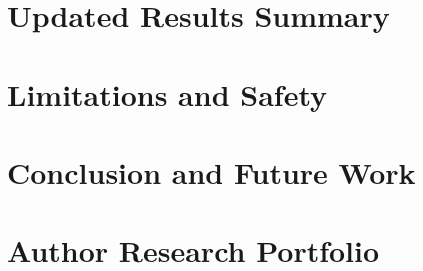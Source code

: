 \documentclass[11pt,a4paper]{article}
\begin{document}
\section{Updated Results Summary}
\label{sec:results-v2}

\section{Limitations and Safety}
\label{sec:limitations}

\section{Conclusion and Future Work}
\label{sec:conclusion}

\clearpage
\appendix
\section{Author Research Portfolio}


\end{document}
